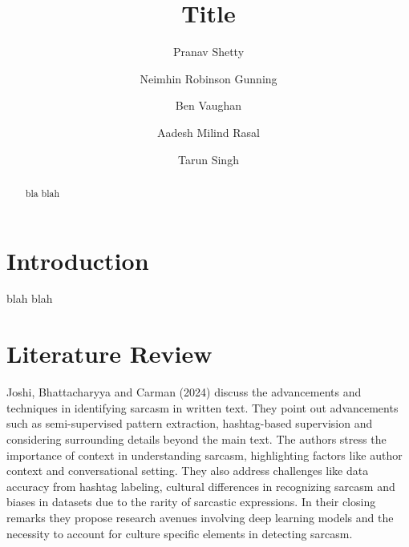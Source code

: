 \documentclass[sigconf, nonacm]{acmart}
\newcommand\vldbpagestyle{plain}
\begin{document}
\title{Title}

\author{Pranav Shetty}

\author{Neimhin Robinson Gunning}

\author{Ben Vaughan}

\author{Aadesh Milind Rasal}

\author{Tarun Singh}

\begin{abstract}
bla blah
\end{abstract}

\maketitle

\pagestyle{\vldbpagestyle}

\section{Introduction}

blah blah 

\section{Literature Review}

Joshi, Bhattacharyya and Carman (2024) discuss the advancements and techniques in identifying sarcasm in written text. They point out advancements such as semi-supervised pattern extraction, hashtag-based supervision and considering surrounding details beyond the main text. The authors stress the importance of context in understanding sarcasm, highlighting factors like author context and conversational setting. They also address challenges like data accuracy from hashtag labeling, cultural differences in recognizing sarcasm and biases in datasets due to the rarity of sarcastic expressions. In their closing remarks they propose research avenues involving deep learning models and the necessity to account for culture specific elements in detecting sarcasm. 
\end{document}
